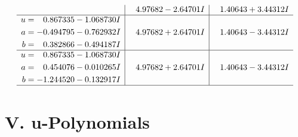 \documentclass[1p]{elsarticle_modified}
\theoremstyle{definition}
\begin{document}
$$\begin{array}{c|c|c}
 & \phantom{-}4.97682 - 2.64701 I & \phantom{-}1.40643 + 3.44312 I \\ \hline\begin{aligned}
u &= \phantom{-}0.867335 - 1.068730 I \\
a &= -0.494795 - 0.762932 I \\
b &= \phantom{-}0.382866 - 0.494187 I\end{aligned}
 & \phantom{-}4.97682 + 2.64701 I & \phantom{-}1.40643 - 3.44312 I \\ \hline\begin{aligned}
u &= \phantom{-}0.867335 - 1.068730 I \\
a &= \phantom{-}0.454076 - 0.010265 I \\
b &= -1.244520 - 0.132917 I\end{aligned}
 & \phantom{-}4.97682 + 2.64701 I & \phantom{-}1.40643 - 3.44312 I\\
 \hline 
 \end{array}$$\newpage
\newpage\renewcommand{\arraystretch}{1}
\centering \section*{ V. u-Polynomials}
\end{document}
